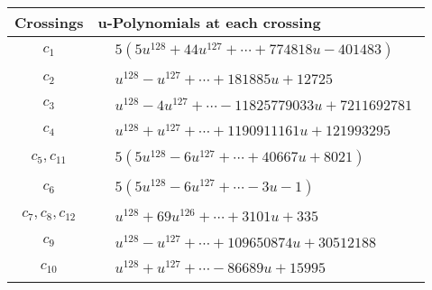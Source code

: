 \documentclass[1p]{elsarticle_modified}
\theoremstyle{definition}
\begin{document}
\begin{tabular}{m{50pt}|m{274pt}}
Crossings & \hspace{64pt}u-Polynomials at each crossing \\
\hline $$\begin{aligned}c_{1}\end{aligned}$$&$\begin{aligned}
&5(5 u^{128}+44 u^{127}+\cdots+774818 u-401483)
\end{aligned}$\\
\hline $$\begin{aligned}c_{2}\end{aligned}$$&$\begin{aligned}
&u^{128}- u^{127}+\cdots+181885 u+12725
\end{aligned}$\\
\hline $$\begin{aligned}c_{3}\end{aligned}$$&$\begin{aligned}
&u^{128}-4 u^{127}+\cdots-11825779033 u+7211692781
\end{aligned}$\\
\hline $$\begin{aligned}c_{4}\end{aligned}$$&$\begin{aligned}
&u^{128}+u^{127}+\cdots+1190911161 u+121993295
\end{aligned}$\\
\hline $$\begin{aligned}c_{5},c_{11}\end{aligned}$$&$\begin{aligned}
&5(5 u^{128}-6 u^{127}+\cdots+40667 u+8021)
\end{aligned}$\\
\hline $$\begin{aligned}c_{6}\end{aligned}$$&$\begin{aligned}
&5(5 u^{128}-6 u^{127}+\cdots-3 u-1)
\end{aligned}$\\
\hline $$\begin{aligned}c_{7},c_{8},c_{12}\end{aligned}$$&$\begin{aligned}
&u^{128}+69 u^{126}+\cdots+3101 u+335
\end{aligned}$\\
\hline $$\begin{aligned}c_{9}\end{aligned}$$&$\begin{aligned}
&u^{128}- u^{127}+\cdots+109650874 u+30512188
\end{aligned}$\\
\hline $$\begin{aligned}c_{10}\end{aligned}$$&$\begin{aligned}
&u^{128}+u^{127}+\cdots-86689 u+15995
\end{aligned}$\\
\hline
\end{tabular}\\~\\
\end{document}
